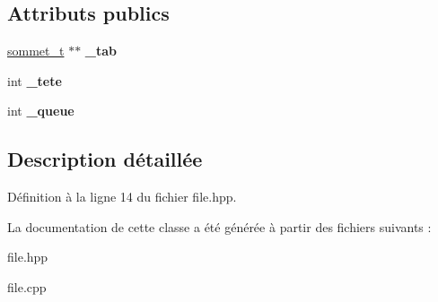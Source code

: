 \subsection*{Attributs publics}
\begin{DoxyCompactItemize}
\item 
\hypertarget{classFile_acfcf59c7a6cc50f3bb57ee66eef61476}{\hyperlink{structsommet}{sommet\+\_\+t} $\ast$$\ast$ {\bfseries \+\_\+tab}}\label{classFile_acfcf59c7a6cc50f3bb57ee66eef61476}

\item 
\hypertarget{classFile_ab47e6eafc5825a4cb0d7b95558c4cd1a}{int {\bfseries \+\_\+tete}}\label{classFile_ab47e6eafc5825a4cb0d7b95558c4cd1a}

\item 
\hypertarget{classFile_aaaf6f5329bd500cdc0db590d2594ab85}{int {\bfseries \+\_\+queue}}\label{classFile_aaaf6f5329bd500cdc0db590d2594ab85}

\end{DoxyCompactItemize}


\subsection{Description détaillée}


Définition à la ligne 14 du fichier file.\+hpp.



La documentation de cette classe a été générée à partir des fichiers suivants \+:\begin{DoxyCompactItemize}
\item 
file.\+hpp\item 
file.\+cpp\end{DoxyCompactItemize}
